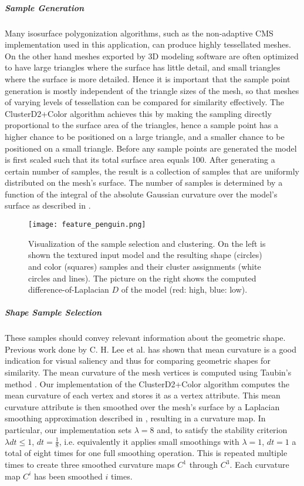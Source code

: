 \subparagraph{Sample Generation}

Many isosurface polygonization algorithms, such as the non-adaptive CMS implementation used in this application, can produce highly tessellated meshes. On the other hand meshes exported by
3D modeling software are often optimized to have large triangles where the surface has little detail, and small triangles where
the surface is more detailed. Hence it is important that the sample point generation is mostly independent of the triangle sizes
of the mesh, so that meshes of varying levels of tessellation can be compared for similarity effectively.
The ClusterD2+Color algorithm achieves this by making the sampling directly proportional to the surface area of the triangles, hence a sample point
has a higher chance to be positioned on a large triangle, and a smaller chance to be positioned on a small triangle.
Before any sample points are generated the model is first scaled such that its total surface area equals 100.
After generating a certain number of samples, the result is a collection of samples that are uniformly distributed on the mesh's surface. The number of samples
is determined by a function of the integral of the absolute Gaussian curvature over the model's surface as described in \cite{cluster_d2_color}.

\begin{figure}
\centering
\captionsetup{width=0.8\textwidth}
\texttt{[image: feature\_penguin.png]}
\caption{Visualization of the sample selection and clustering. On the left is shown the textured input model and the resulting shape (circles) and color (squares) samples
and their cluster assignments (white circles and lines). The picture on the right shows the computed difference-of-Laplacian $D$ of the model (red: high, blue: low).}
\label{fig:feature_penguin}
\end{figure}

\subparagraph{Shape Sample Selection}

These samples should convey relevant information about the geometric shape. Previous work done by C. H. Lee et al. \cite{mesh_saliency} has
shown that mean curvature is a good indication for visual saliency and thus for comparing geometric shapes for similarity. The mean curvature of the mesh vertices is computed using Taubin's method \cite{taubin_method}.
Our implementation of the ClusterD2+Color algorithm computes the mean curvature of each vertex and stores it as a vertex attribute. This mean curvature attribute is then smoothed over the mesh's surface
by a Laplacian smoothing approximation described in \cite{implicit_fairing}, resulting in a curvature map.
In particular, our implementation sets $\lambda = 8$ and, to satisfy the stability criterion $\lambda dt \leq 1$, $dt = \frac{1}{8}$, i.e. equivalently it applies small smoothings with $\lambda = 1$, $dt = 1$ a total of eight times for one
full smoothing operation. This is repeated multiple times to create three smoothed curvature maps $C^1$ through $C^3$. Each curvature map $C^i$ has been smoothed $i$ times.

